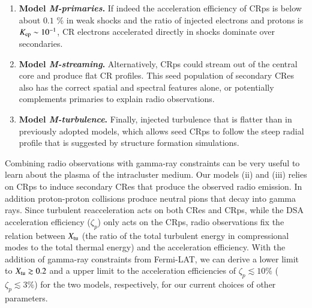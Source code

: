 \documentclass[fleqn,usenatbib,useAMS]{mnras}
\begin{document}
\begin{enumerate}
\item {\bf Model {\em M-primaries}.} If indeed the acceleration
  efficiency of CRps is below about $0.1$ {\%} in weak shocks and the
  ratio of injected electrons and protons is $K_{{\mathrm{ep}}} \sim
  10^{-1}$, CR electrons accelerated directly in shocks dominate over
  secondaries.
\item {\bf Model {\em M-streaming}.} Alternatively, CRps could stream
  out of the central core and produce flat CR profiles. This seed
  population of secondary CRes also has the correct spatial and
  spectral features alone, or potentially complements primaries to
  explain radio observations.
\item {\bf Model {\em M-turbulence}.}  Finally, injected turbulence
  that is flatter than in previously adopted models, which allows seed
  CRps to follow the steep radial profile that is suggested by
  structure formation simulations.
\end{enumerate}

Combining radio observations with gamma-ray constraints can be very
useful to learn about the plasma of the intracluster medium. Our
models (ii) and (iii) relies on CRps to induce secondary CRes that
produce the observed radio emission. In addition proton-proton
collisions produce neutral pions that decay into gamma rays. Since
turbulent reacceleration acts on both CRes and CRps, while the DSA
acceleration efficiency ($\zeta_p$) only acts on the CRps, radio
observations fix the relation between $X_{\mathrm{tu}}$ (the ratio of the
total turbulent energy in compressional modes to the total thermal
energy) and the acceleration efficiency. With the addition of
gamma-ray constraints from Fermi-LAT, we can derive a lower limit to
$X_{\mathrm{tu}}\gtrsim0.2$ and a upper limit to the acceleration
efficiencies of $\zeta_p\lesssim 10\%$ ($\zeta_p\lesssim 3\%$) for
the two models, respectively, for our current choices of other
parameters.
\end{document}
